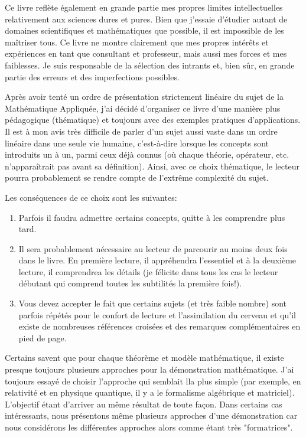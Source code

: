 	Ce livre reflète également en grande partie mes propres limites intellectuelles relativement aux sciences dures et pures. Bien que j'essaie d'étudier autant de domaines scientifiques et mathématiques que possible, il est impossible de les maîtriser tous. Ce livre ne montre clairement que mes propres intérêts et expériences en tant que consultant et professeur, mais aussi mes forces et mes faiblesses. Je suis responsable de la sélection des intrants et, bien sûr, en grande partie des erreurs et des imperfections possibles.

	Après avoir tenté un ordre de présentation strictement linéaire du sujet de la Mathématique Appliquée, j'ai décidé d'organiser ce livre d'une manière plus pédagogique (thématique) et toujours avec des exemples pratiques d'applications. Il est à mon avis très difficile de parler d'un sujet aussi vaste dans un ordre linéaire dans une seule vie humaine, c'est-à-dire lorsque les concepts sont introduits un à un, parmi ceux déjà connus (où chaque théorie, opérateur, etc. n'apparaîtrait pas avant sa définition). Ainsi, avec ce choix thématique, le lecteur pourra probablement se rendre compte de l'extrême complexité du sujet.

	Les conséquences de ce choix sont les suivantes:
	\begin{enumerate}
		\item Parfois il faudra admettre certains concepts, quitte à les comprendre plus tard.
	
		\item Il sera probablement nécessaire au lecteur de parcourir au moins deux fois dans le livre. En première lecture, il appréhendra l'essentiel et à la deuxième lecture, il comprendrea les détails (je félicite dans tous les cas le lecteur débutant qui comprend toutes les subtilités la première fois!).
	
		\item Vous devez accepter le fait que certains sujets (et très faible nombre) sont parfois répétés pour le confort de lecture et l'assimilation du cerveau et qu'il existe de nombreuses références croisées et des remarques complémentaires en pied de page.
	\end{enumerate}
	
	Certains savent que pour chaque théorème et modèle mathématique, il existe presque toujours plusieurs approches pour la démonstration mathématique. J'ai toujours essayé de choisir l'approche qui semblait lla plus simple (par exemple, en relativité et en physique quantique, il y a le formalisme algébrique et matriciel). L'objectif étant d'arriver au même résultat de toute façon. Dans certains cas intéressants, nous présentons même plusieurs approches d'une démonstration car nous considérons les différentes approches alors comme étant très "formatrices".
	
